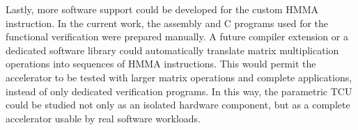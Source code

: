 Lastly, more software support could be developed for the custom HMMA
instruction. In the current work, the assembly and C programs used for
the functional verification were prepared manually. A future compiler
extension or a dedicated software library could automatically translate
matrix multiplication operations into sequences of HMMA instructions.
This would permit the accelerator to be tested with larger matrix
operations and complete applications, instead of only dedicated
verification programs. In this way, the parametric TCU could be studied
not only as an isolated hardware component, but as a complete
accelerator usable by real software workloads.